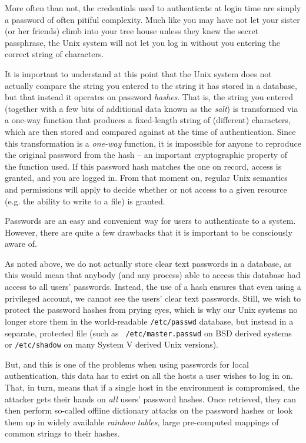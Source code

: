 More often than not, the credentials used to
authenticate at login time are simply a password of
often pitiful complexity.  Much like you may have not
let your sister (or her friends) climb into your tree
house unless they knew the secret passphrase, the Unix
system will not let you log in without you entering
the correct string of characters.

It is important to understand at this point that the
Unix system does not actually compare the string you
entered to the string it has stored in a database, but
that instead it operates on password {\em hashes}.
That is, the string you entered (together with a few
bits of additional data known as the {\em salt}) is
transformed via a one-way function that produces a
fixed-length string of (different) characters, which
are then stored and compared against at the time of
authentication.  Since this transformation is a {\em
one-way} function, it is impossible for anyone to
reproduce the original password from the hash -- an
important cryptographic property of the function used.
If this password hash matches the one on record,
access is granted, and you are logged in.  From that
moment on, regular Unix semantics and permissions will
apply to decide whether or not access to a given
resource (e.g. the ability to write to a file) is
granted.

Passwords are an easy and convenient way for users to
authenticate to a system.  However, there are quite a
few drawbacks that it is important to be consciously
aware of.

As noted above, we do not actually store clear text
passwords in a database, as this would mean that
anybody (and any process) able to access this database
had access to all users' passwords.  Instead, the
use of a hash ensures that even using a privileged
account, we cannot see the users' clear text
passwords.  Still, we wish to protect the password
hashes from prying eyes, which is why our Unix
systems no longer store them in the world-readable
{\tt /etc/passwd} database, but instead in a separate,
protected file (such as {\tt
/etc/master.passwd} on
BSD derived systems or {\tt /etc/shadow} on many System V derived Unix
versions).

But, and this is one of the problems when using
passwords for local authentication, this data has to
exist on all the hosts a user wishes to log in on.
That, in turn, means that if a single host in the
environment is compromised, the attacker gets their
hands on {\em all} users' password hashes.  Once
retrieved, they can then perform so-called offline
dictionary attacks on the password hashes or look them
up in widely available {\em rainbow
tables}, large pre-computed
mappings of common strings to their hashes.


